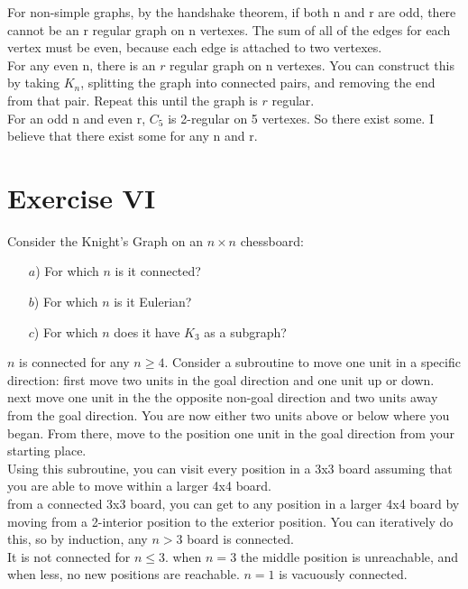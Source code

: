 \documentclass[fontsize=11pt]{scrartcl} %
\numberwithin{equation}{section} %
\numberwithin{figure}{section} %
\numberwithin{table}{section} %
\begin{document}
	For non-simple graphs, by the handshake theorem, if both n and r are odd, there cannot be an r regular graph on n vertexes.  The sum of all of the edges for each vertex must be even, because each edge is attached to two vertexes.  \\
	
	For any even n, there is an $r$ regular graph on n vertexes.  You can construct this by taking $K_n$, splitting the graph into connected pairs, and removing the end from that pair.  Repeat this until the graph is $r$ regular.  \\
	
	For an odd n and even r, $C_5$ is 2-regular on 5 vertexes.  So there exist some.  I believe that there exist some for any n and r.  


\section*{Exercise VI}

 Consider the Knight's Graph on an $n \times n$ chessboard:\\ 
	\begin{enumerate}
		\item[$a$)] For which $n$ is it connected?
		\item[$b$)] For which $n$ is it Eulerian?
		\item[$c$)] For which $n$ does it have $K_3$ as a subgraph?
	\end{enumerate}
$n$ is connected for any $n \geq 4$.  Consider a subroutine to move one unit in a specific direction: first move two units in the goal direction and one unit up or down.  next move one unit in the the opposite non-goal direction and two units away from the goal direction.  You are now either two units above or below where you began.  From there, move to the position one unit in the goal direction from your starting place.  \\

Using this subroutine, you can visit every position in a 3x3 board assuming that you are able to move within a larger 4x4 board.  \\


from a connected 3x3 board, you can get to any position in a larger 4x4 board by moving from a 2-interior position to the exterior position.  You can iteratively do this, so by induction, any $n>3$ board is connected.  \\

It is not connected for $n \leq 3$.  when $n = 3$ the middle position is unreachable, and when less, no new positions are reachable.  $n=1$ is vacuously connected.  \\
\end{document}
